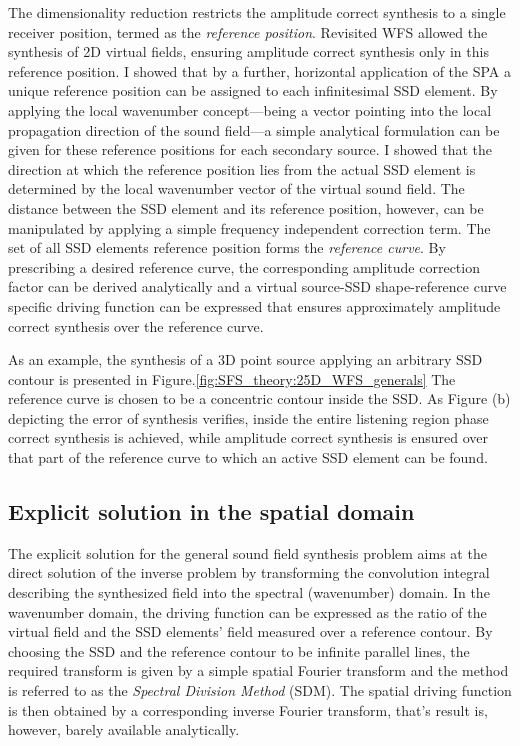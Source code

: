 \documentclass[10pt,twoside]{article}
\theoremstyle{thesisgroupstyle}
\theoremstyle{indented}
\begin{document}
The dimensionality reduction restricts the amplitude correct synthesis to a single receiver position, termed as the \emph{reference position}.
Revisited WFS allowed the synthesis of 2D virtual fields, ensuring amplitude correct synthesis only in this reference position.
I showed that by a further, horizontal application of the SPA a unique reference position can be assigned to each infinitesimal SSD element.
By applying the local wavenumber concept---being a vector pointing into the local propagation direction of the sound field---a simple analytical formulation can be given for these reference positions for each secondary source.
I showed that the direction at which the reference position lies from the actual SSD element is determined by the local wavenumber vector of the virtual sound field.
The distance between the SSD element and its reference position, however, can be manipulated by applying a simple frequency independent correction term.
The set of all SSD elements reference position forms the \emph{reference curve}.
By prescribing a desired reference curve, the corresponding amplitude correction factor can be derived analytically and a virtual source-SSD shape-reference curve specific driving function can be expressed that ensures approximately amplitude correct synthesis over the reference curve.\cite{Firtha2016_booklet}

As an example, the synthesis of a 3D point source applying an arbitrary SSD contour is presented in Figure.\ref{fig:SFS_theory:25D_WFS_generals}
The reference curve is chosen to be a concentric contour inside the SSD.
As Figure (b) depicting the error of synthesis verifies, inside the entire listening region phase correct synthesis is achieved, while amplitude correct synthesis is ensured over that part of the reference curve to which an active SSD element can be found.

\subsection{Explicit solution in the spatial domain}
The explicit solution for the general sound field synthesis problem aims at the direct solution of the inverse problem by transforming the convolution integral describing the synthesized field into the spectral (wavenumber) domain.
In the wavenumber domain, the driving function can be expressed as the ratio of the virtual field and the SSD elements' field measured over a reference contour.
By choosing the SSD and the reference contour to be infinite parallel lines, the required transform is given by a simple spatial Fourier transform and the method is referred to as the \emph{Spectral Division Method } (SDM).
The spatial driving function is then obtained by a corresponding inverse Fourier transform, that's result is, however, barely available analytically.
\end{document}
